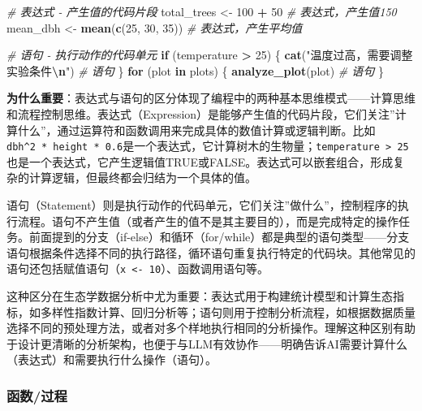 \documentclass[
  twoside]{book}
\newenvironment{Shaded}{\begin{snugshade}}{\end{snugshade}}
\newcommand{\CommentTok}[1]{\textcolor[rgb]{0.56,0.35,0.01}{\textit{#1}}}
\newcommand{\ControlFlowTok}[1]{\textcolor[rgb]{0.13,0.29,0.53}{\textbf{#1}}}
\newcommand{\DecValTok}[1]{\textcolor[rgb]{0.00,0.00,0.81}{#1}}
\newcommand{\FunctionTok}[1]{\textcolor[rgb]{0.13,0.29,0.53}{\textbf{#1}}}
\newcommand{\NormalTok}[1]{#1}
\newcommand{\OtherTok}[1]{\textcolor[rgb]{0.56,0.35,0.01}{#1}}
\newcommand{\SpecialCharTok}[1]{\textcolor[rgb]{0.81,0.36,0.00}{\textbf{#1}}}
\newcommand{\StringTok}[1]{\textcolor[rgb]{0.31,0.60,0.02}{#1}}
\begin{document}
\begin{Shaded}
\begin{Highlighting}[]
\CommentTok{\# 表达式 {-} 产生值的代码片段}
\NormalTok{total\_trees }\OtherTok{\textless{}{-}} \DecValTok{100} \SpecialCharTok{+} \DecValTok{50}  \CommentTok{\# 表达式，产生值150}
\NormalTok{mean\_dbh }\OtherTok{\textless{}{-}} \FunctionTok{mean}\NormalTok{(}\FunctionTok{c}\NormalTok{(}\DecValTok{25}\NormalTok{, }\DecValTok{30}\NormalTok{, }\DecValTok{35}\NormalTok{))  }\CommentTok{\# 表达式，产生平均值}

\CommentTok{\# 语句 {-} 执行动作的代码单元}
\ControlFlowTok{if}\NormalTok{ (temperature }\SpecialCharTok{\textgreater{}} \DecValTok{25}\NormalTok{) \{}
  \FunctionTok{cat}\NormalTok{(}\StringTok{"温度过高，需要调整实验条件}\SpecialCharTok{\textbackslash{}n}\StringTok{"}\NormalTok{)  }\CommentTok{\# 语句}
\NormalTok{\}}
\ControlFlowTok{for}\NormalTok{ (plot }\ControlFlowTok{in}\NormalTok{ plots) \{}
  \FunctionTok{analyze\_plot}\NormalTok{(plot)  }\CommentTok{\# 语句}
\NormalTok{\}}
\end{Highlighting}
\end{Shaded}

\textbf{为什么重要}：表达式与语句的区分体现了编程中的两种基本思维模式------计算思维和流程控制思维。表达式（Expression）是能够产生值的代码片段，它们关注''计算什么''，通过运算符和函数调用来完成具体的数值计算或逻辑判断。比如\texttt{dbh\^{}2\ *\ height\ *\ 0.6}是一个表达式，它计算树木的生物量；\texttt{temperature\ \textgreater{}\ 25}也是一个表达式，它产生逻辑值TRUE或FALSE。表达式可以嵌套组合，形成复杂的计算逻辑，但最终都会归结为一个具体的值。

语句（Statement）则是执行动作的代码单元，它们关注''做什么''，控制程序的执行流程。语句不产生值（或者产生的值不是其主要目的），而是完成特定的操作任务。前面提到的分支（if-else）和循环（for/while）都是典型的语句类型------分支语句根据条件选择不同的执行路径，循环语句重复执行特定的代码块。其他常见的语句还包括赋值语句（\texttt{x\ \textless{}-\ 10}）、函数调用语句等。

这种区分在生态学数据分析中尤为重要：表达式用于构建统计模型和计算生态指标，如多样性指数计算、回归分析等；语句则用于控制分析流程，如根据数据质量选择不同的预处理方法，或者对多个样地执行相同的分析操作。理解这种区别有助于设计更清晰的分析架构，也便于与LLM有效协作------明确告诉AI需要计算什么（表达式）和需要执行什么操作（语句）。

\hypertarget{ux51fdux6570ux8fc7ux7a0b}{%
\subsubsection{函数/过程}\label{ux51fdux6570ux8fc7ux7a0b}}
\end{document}
